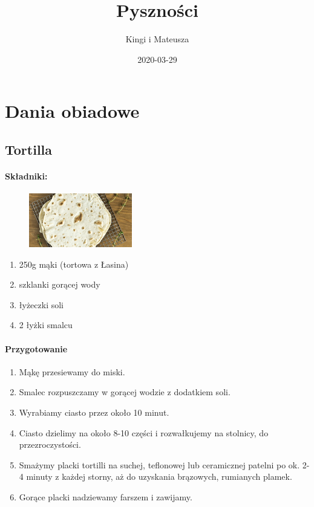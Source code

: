 \documentclass{article}
\title{Pyszności}
\author{Kingi i Mateusza}
\date{2020-03-29}
\begin{document}
    \maketitle
    \newpage
    \tableofcontents
    \newpage

    \section{Dania obiadowe}
    \medskip
    \subsection{Tortilla}
    \bigskip
    \paragraph{Składniki:}
    \begin{figure}
        \includegraphics[width=0.4\textwidth]{tortilla.jpg}
    \end{figure}
    \begin{enumerate}
        \item 250g mąki (tortowa z Łasina)
        \item {} szklanki gorącej wody
        \item {} łyżeczki soli
        \item 2 łyżki smalcu
    \end{enumerate}

    \paragraph{Przygotowanie}
    \begin{enumerate}
        \item Mąkę przesiewamy do miski.
        \item Smalec rozpuszczamy w gorącej wodzie z dodatkiem soli.
        \item Wyrabiamy ciasto przez około 10 minut.
        \item Ciasto dzielimy na około 8-10 części i rozwałkujemy na stolnicy,
            do przezroczystości.
        \item Smażymy placki tortilli na suchej, teflonowej lub ceramicznej
            patelni po ok. 2-4 minuty z każdej storny, aż do uzyskania
            brązowych, rumianych plamek.
        \item Gorące placki nadziewamy farszem i zawijamy.
    \end{enumerate}
\end{document}
